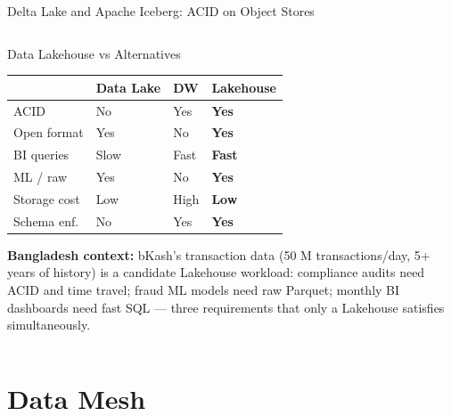 \documentclass[aspectratio=169,10pt]{beamer}
\begin{document}
\begin{frame}{Delta Lake and Apache Iceberg: ACID on Object Stores}
\begin{columns}[T]
      \begin{exampleblock}{Data Lakehouse vs Alternatives}
        {\small
        \renewcommand{\arraystretch}{1.35}
        \begin{tabular}{p{1.5cm}p{1.2cm}p{1.2cm}p{1.5cm}}
          \toprule
          & \textbf{Data Lake} & \textbf{DW} & \textbf{Lakehouse} \\
          \midrule
          ACID         & No     & Yes   & \textbf{Yes} \\
          Open format  & Yes    & No    & \textbf{Yes} \\
          BI queries   & Slow   & Fast  & \textbf{Fast} \\
          ML / raw     & Yes    & No    & \textbf{Yes} \\
          Storage cost & Low    & High  & \textbf{Low} \\
          Schema enf.  & No     & Yes   & \textbf{Yes} \\
          \bottomrule
        \end{tabular}
        }
        \vspace{6pt}
        \textbf{Bangladesh context:}  bKash's transaction data (50 M transactions/day, 5+ years of history) is a candidate Lakehouse workload: compliance audits need ACID and time travel; fraud ML models need raw Parquet; monthly BI dashboards need fast SQL --- three requirements that only a Lakehouse satisfies simultaneously.
      \end{exampleblock}
  \end{columns}
\end{frame}

\section{Data Mesh}
\end{document}
